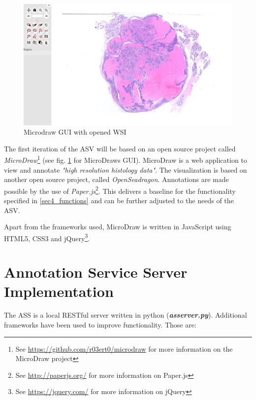 \begin{figure}[H]
	\begin{center}
		\includegraphics[scale=0.2]{img/microdrawUI.png}
		\caption{Microdraw GUI with opened WSI}
		\label{fig4_microdrawUI}
	\end{center}
\end{figure}

The first iteration of the ASV will be based on an open source project called \emph{MicroDraw}\footnote{See \url{https://github.com/r03ert0/microdraw} for more information on the MicroDraw project} (see fig. \ref{fig4_microdrawUI} for MicroDraws GUI).  MicroDraw is a web application to view and annotate \emph{"high resolution histology data"}\cite{web:microdraw2}. The visualization is based on another open source project, called \emph{OpenSeadragon}\cite{web:openseadragon}. Annotations are made possible by the use of \emph{Paper.js}\footnote{See \url{http://paperjs.org/} for more information on Paper.js}. This delivers a baseline for the functionality specified in \ref{sec4_functions} and can be further adjusted to the needs of the ASV.

Apart from the frameworks used, MicroDraw is written in JavaScript using HTML5, CSS3 and jQuery\footnote{See \url{https://jquery.com/} for more information on jQuery}.

\section{Annotation Service Server Implementation}

The ASS is a local RESTful server written in python (\emph{\textbf{as{\textunderscore}server.py}}). Additional frameworks have been used to improve functionality. Those are:

